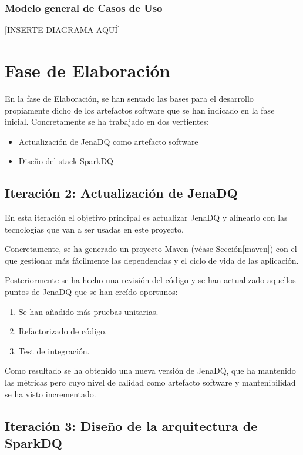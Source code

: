 \subsubsection{Modelo general de Casos de Uso}

[INSERTE DIAGRAMA AQUÍ]

\section{Fase de Elaboración}

En la fase de Elaboración, se han sentado las bases para el desarrollo
propiamente dicho de los artefactos software que se han indicado en la fase
inicial. Concretamente se ha trabajado en dos vertientes:

\begin{itemize}
\item Actualización de JenaDQ como artefacto software
\item Diseño del stack SparkDQ
\end{itemize}

\subsection{Iteración 2: Actualización de JenaDQ}



En esta iteración el objetivo principal es actualizar JenaDQ y alinearlo con las
tecnologías que van a ser usadas en este proyecto.

Concretamente, se ha generado
un proyecto Maven (véase Sección\ref{maven}) con el que gestionar más fácilmente
las dependencias y el ciclo de vida de las aplicación.

Posteriormente se ha hecho una revisión del código y se han actualizado aquellos
puntos de JenaDQ que se han creído oportunos:

\begin{enumerate}
\item Se han añadido más pruebas unitarias.
\item Refactorizado de código.
\item Test de integración.
\end{enumerate}

Como resultado se ha obtenido una nueva versión de JenaDQ, que ha mantenido las
métricas pero cuyo nivel de calidad como artefacto software y mantenibilidad se
ha visto incrementado.

\subsection{Iteración 3: Diseño de la arquitectura de SparkDQ}

